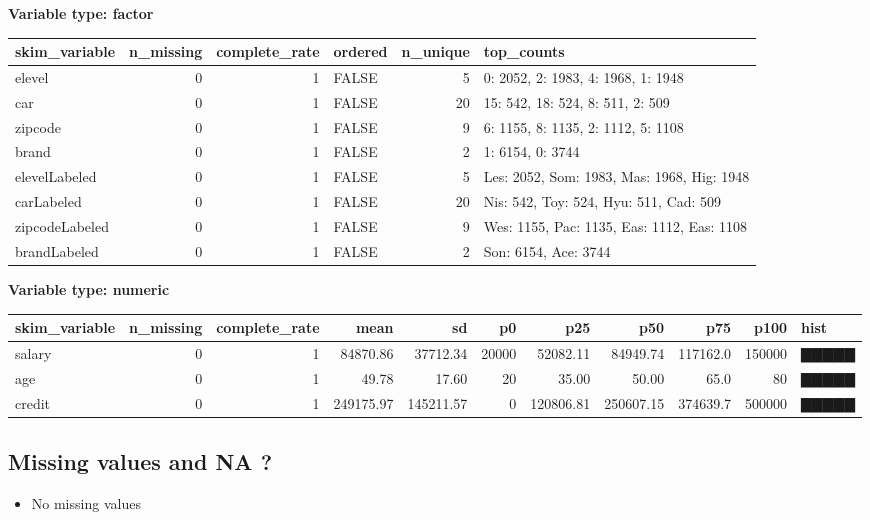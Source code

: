 \documentclass[
]{article}
\providecommand{\tightlist}{%
  \setlength{\itemsep}{0pt}\setlength{\parskip}{0pt}}
\begin{document}
\textbf{Variable type: factor}

\begin{longtable}[]{@{}lrrlrl@{}}
\toprule
skim\_variable & n\_missing & complete\_rate & ordered & n\_unique &
top\_counts \\
\midrule
\endhead
elevel & 0 & 1 & FALSE & 5 & 0: 2052, 2: 1983, 4: 1968, 1: 1948 \\
car & 0 & 1 & FALSE & 20 & 15: 542, 18: 524, 8: 511, 2: 509 \\
zipcode & 0 & 1 & FALSE & 9 & 6: 1155, 8: 1135, 2: 1112, 5: 1108 \\
brand & 0 & 1 & FALSE & 2 & 1: 6154, 0: 3744 \\
elevelLabeled & 0 & 1 & FALSE & 5 & Les: 2052, Som: 1983, Mas: 1968,
Hig: 1948 \\
carLabeled & 0 & 1 & FALSE & 20 & Nis: 542, Toy: 524, Hyu: 511, Cad:
509 \\
zipcodeLabeled & 0 & 1 & FALSE & 9 & Wes: 1155, Pac: 1135, Eas: 1112,
Eas: 1108 \\
brandLabeled & 0 & 1 & FALSE & 2 & Son: 6154, Ace: 3744 \\
\bottomrule
\end{longtable}

\textbf{Variable type: numeric}

\begin{longtable}[]{@{}lrrrrrrrrrl@{}}
\toprule
skim\_variable & n\_missing & complete\_rate & mean & sd & p0 & p25 &
p50 & p75 & p100 & hist \\
\midrule
\endhead
salary & 0 & 1 & 84870.86 & 37712.34 & 20000 & 52082.11 & 84949.74 &
117162.0 & 150000 & ▇▇▇▇▇ \\
age & 0 & 1 & 49.78 & 17.60 & 20 & 35.00 & 50.00 & 65.0 & 80 & ▇▇▇▇▇ \\
credit & 0 & 1 & 249175.97 & 145211.57 & 0 & 120806.81 & 250607.15 &
374639.7 & 500000 & ▇▇▇▇▇ \\
\bottomrule
\end{longtable}

\hypertarget{missing-values-and-na}{%
\subsection{Missing values and NA ?}\label{missing-values-and-na}}

\begin{itemize}
\tightlist
\item
  No missing values
\end{itemize}
\end{document}

